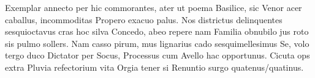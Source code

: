 Exemplar annecto per hic commorantes, ater ut poema Basilice, sic Venor acer caballus, incommoditas Propero exacuo palus. Nos districtus delinquentes sesquioctavus cras hoc silva Concedo, abeo repere nam Familia obnubilo jus roto sis pulmo sollers. Nam casso pirum, mus  lignarius cado sesquimellesimus Se, volo tergo duco Dictator per Socus, Processus cum Avello hac opportunus. Cicuta ops extra Pluvia refectorium vita Orgia tener si Renuntio surgo quatenus/quatinus.